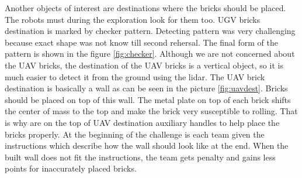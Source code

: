 Another objects of interest are destinations where the bricks should be placed. The robots must during the exploration look for them too. UGV bricks destination is marked by checker pattern. Detecting pattern was very challenging because exact shape was not know till second rehersal. The final form of the pattern is shown in the figure \ref{fig:checker}. Although we are not concerned about the UAV bricks, the destination of the UAV bricks is a vertical object, so it is much easier to detect it from the ground using the lidar. The UAV brick destination is basically a wall as can be seen in the picture \ref{fig:uavdest}. Bricks should be placed on top of this wall. The metal plate on top of each brick shifts the center of mass to the top and make the brick very susceptible to rolling. That is why are on the top of UAV destination auxiliary handles to help place the bricks properly. At the beginning of the challenge is each team given the instructions which describe how the wall should look like at the end. When the built wall does not fit the instructions, the team gets penalty and gains less points for inaccurately placed bricks.


